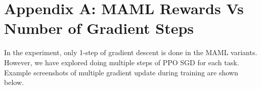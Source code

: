 \documentclass{article} %
\begin{document}
\newpage


\newpage


{

\newpage

%
\section{Appendix A: MAML Rewards Vs Number of Gradient Steps} 

In the experiment, only 1-step of gradient descent is done in the MAML variants. However, we have explored doing multiple steps of PPO SGD for each task. Example screenshots of multiple gradient update during training are shown below.

}
\end{document}
